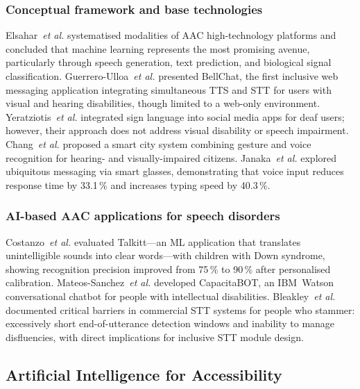 \documentclass[journal]{IEEEtran}
\begin{document}
	\subsubsection{Conceptual framework and base technologies}
	Elsahar~\textit{et al.} \cite{elsahar2019} systematised modalities
	of AAC high-technology platforms and concluded that machine learning
	represents the most promising avenue, particularly through speech
	generation, text prediction, and biological signal classification.
	Guerrero-Ulloa~\textit{et al.} \cite{guerrero2021bellchat}
	presented BellChat, the first inclusive web messaging application
	integrating simultaneous TTS and STT for users with visual
	and hearing disabilities, though limited to a web-only environment.
	Yeratziotis~\textit{et al.} \cite{yeratziotis2023} integrated
	sign language into social media apps for deaf users; however,
	their approach does not address visual disability or speech impairment.
	Chang~\textit{et al.} \cite{chang2022} proposed a smart city
	system combining gesture and voice recognition for hearing- and
	visually-impaired citizens.
	Janaka~\textit{et al.} \cite{janaka2023} explored ubiquitous
	messaging via smart glasses, demonstrating that voice input reduces
	response time by 33.1\,\% and increases typing speed by 40.3\,\%.
	
	\subsubsection{AI-based AAC applications for speech disorders}
	Costanzo~\textit{et al.} \cite{costanzo2023} evaluated Talkitt---an
	ML application that translates unintelligible sounds into clear
	words---with children with Down syndrome, showing recognition
	precision improved from 75\,\% to 90\,\% after personalised
	calibration.
	Mateos-Sanchez~\textit{et al.} \cite{mateos2022} developed
	CapacitaBOT, an IBM~Watson conversational chatbot for people
	with intellectual disabilities.
	Bleakley~\textit{et al.} \cite{bleakley2022} documented critical
	barriers in commercial STT systems for people who stammer:
	excessively short end-of-utterance detection windows and inability
	to manage disfluencies, with direct implications for inclusive
	STT module design.
	
	\subsection{Artificial Intelligence for Accessibility}
	
\end{document}
